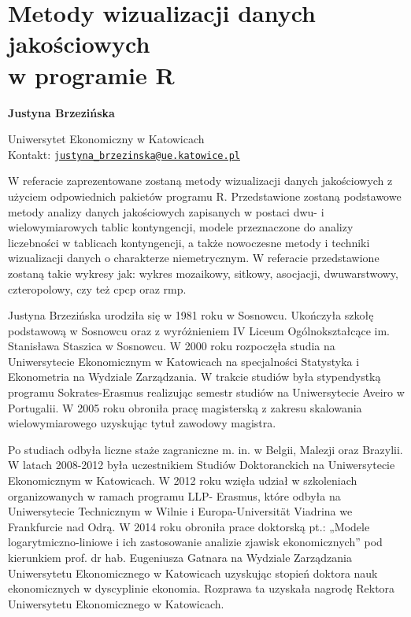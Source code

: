 \documentclass[\main/boa.tex]{subfiles}
\begin{document}
\section[Metody wizualizacji danych jakościowych w programie R]{Metody wizualizacji danych jakościowych \\ w programie R}


\begin{minipage}{0.915\textwidth}
	\centering
  {\bf \LARGE {} Justyna Brzezińska}
\end{minipage}


\begin{affiliations}
\begin{minipage}{0.915\textwidth}
\centering
\large Uniwersytet Ekonomiczny w Katowicach   \\[1pt]
Kontakt: \href{mailto:justyna_brzezinska@ue.katowice.pl}{\nolinkurl{justyna_brzezinska@ue.katowice.pl}}\\
\end{minipage}
\end{affiliations}

W referacie zaprezentowane zostaną metody wizualizacji danych jakościowych z użyciem odpowiednich pakietów programu R. Przedstawione zostaną podstawowe metody analizy danych jakościowych zapisanych w postaci dwu- i wielowymiarowych tablic kontyngencji, modele przeznaczone do analizy liczebności w tablicach kontyngencji, a także nowoczesne metody i techniki wizualizacji danych o charakterze niemetrycznym. W referacie przedstawione zostaną takie wykresy jak: wykres mozaikowy, sitkowy, asocjacji, dwuwarstwowy, czteropolowy, czy też cpcp oraz rmp. 

\bio
Justyna Brzezińska urodziła się w 1981 roku w Sosnowcu. Ukończyła szkołę podstawową w Sosnowcu oraz z wyróżnieniem IV Liceum Ogólnokształcące im. Stanisława Staszica w Sosnowcu. W 2000 roku rozpoczęła studia na Uniwersytecie Ekonomicznym w Katowicach na specjalności Statystyka i Ekonometria na Wydziale Zarządzania. W trakcie studiów była stypendystką programu Sokrates-Erasmus realizując semestr studiów na Uniwersytecie Aveiro w Portugalii. W 2005 roku obroniła pracę magisterską z zakresu skalowania wielowymiarowego uzyskując tytuł zawodowy magistra.

Po studiach odbyła liczne staże zagraniczne m. in. w Belgii, Malezji oraz Brazylii. W latach 2008-2012 była uczestnikiem Studiów Doktoranckich na Uniwersytecie Ekonomicznym w Katowicach. W 2012 roku wzięła udział w szkoleniach organizowanych w ramach programu LLP- Erasmus, które odbyła na Uniwersytecie Technicznym w Wilnie i Europa-Universität Viadrina we Frankfurcie nad Odrą. W 2014 roku obroniła prace doktorską pt.: „Modele logarytmiczno-liniowe i ich zastosowanie analizie zjawisk ekonomicznych” pod kierunkiem prof. dr hab. Eugeniusza Gatnara na Wydziale Zarządzania Uniwersytetu Ekonomicznego w Katowicach uzyskując stopień doktora nauk ekonomicznych w dyscyplinie ekonomia. Rozprawa ta uzyskała nagrodę Rektora Uniwersytetu Ekonomicznego w Katowicach.
\end{document}
